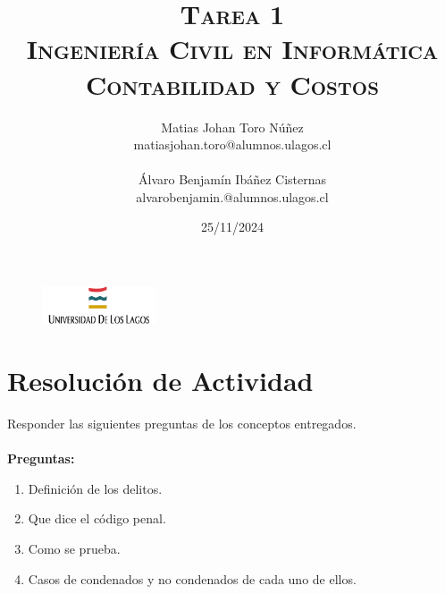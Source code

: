 \documentclass[letter,12pt]{article}
\begin{document}
	\begin{figure}
		\includegraphics[width=0.3\textwidth, left]{images/download.png}
	\end{figure}
	\setlength{\unitlength}{1 cm} 
	\title{\scshape\Huge{Tarea 1}\\\vspace{3cm}
		\Large Ingeniería Civil en Informática\\\vspace{1cm}
		\Large Contabilidad y Costos\\\vspace{2cm}}
	
	\author{
		Matias Johan Toro Núñez\\
		matiasjohan.toro@alumnos.ulagos.cl\\\\
		Álvaro Benjamín Ibáñez Cisternas\\
		alvarobenjamin.@alumnos.ulagos.cl
	\vspace{3cm}}
	
	\date{25/11/2024}
	\maketitle
	\thispagestyle{empty}
	\clearpage
	\setcounter{page}{1}
	
	\tableofcontents
	\newpage
	
	
	\section{Resolución de Actividad}
	Responder las siguientes preguntas de los conceptos entregados.\\\\
	\textbf{Preguntas:}
	\begin{enumerate}
		\item Definición de los delitos.\\
		\item Que dice el código penal.\\
		\item Como se prueba.\\
		\item Casos de condenados y no condenados de cada uno de ellos.\\\\
	\end{enumerate}
	
\end{document}
